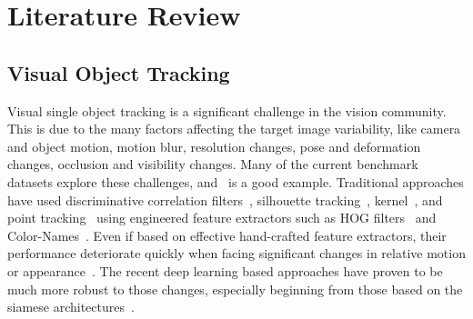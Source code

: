 \chapter{Literature Review} %

\label{Chapter2} %

\section{Visual Object Tracking}
Visual single object tracking is a significant challenge in the vision community. This is due to the many factors affecting the target image variability, like camera and object motion, motion blur, resolution changes, pose and deformation changes, occlusion and visibility changes. Many of the current benchmark datasets explore these challenges, and~\cite{noman2022avist} is a good example. Traditional approaches have used discriminative correlation filters~\cite{henriques2014high, ding2017real, marvasti2019rotation, marvasti2021adaptive, marvasti2021efficient}, silhouette tracking~\cite{xiao2016efficient}, kernel~\cite{bruni2014improvement}, and point tracking~\cite{lychkov2018tracking} using engineered feature extractors such as HOG filters~\cite{dalal2005histograms} and Color-Names~\cite{van2007learning}. Even if based on effective hand-crafted feature extractors, their performance deteriorate quickly when facing significant changes in relative motion or appearance~\cite{marvasti2021deep}. The recent deep learning based approaches have proven to be much more robust to those changes, especially beginning from those based on the siamese architectures~\cite{koch2015siamese,melekhov2016siamese}. 

